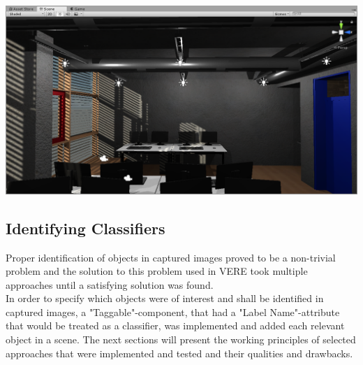 \begin{center}
\noindent\includegraphics[width=14cm]{tex/img/ch05/UnitySceneA205_02.png}
\label{fig:unity-scene-a205}
\end{center}

\subsection{Identifying Classifiers}
Proper identification of objects in captured images proved to be a non-trivial problem and the solution to this problem used in VERE took multiple approaches until a satisfying solution was found.\\
In order to specify which objects were of interest and shall be identified in captured images, a "Taggable"-component, that had a "Label Name"-attribute that would be treated as a classifier, was implemented and added each relevant object in a scene. The next sections will present the working principles of selected approaches that were implemented and tested and their qualities and drawbacks.

